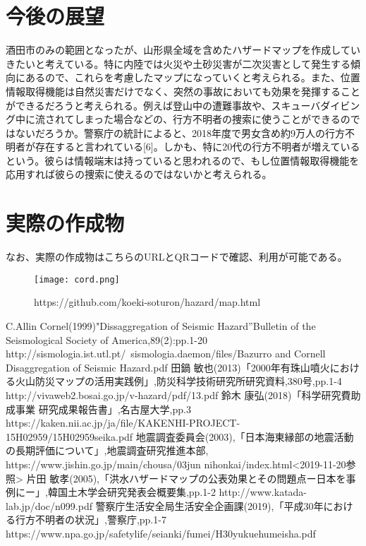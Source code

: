 \documentclass[a4j,twocolumn,dvipdfmx]{jarticle}
\begin{document}
     \section{今後の展望}
酒田市のみの範囲となったが、山形県全域を含めたハザードマップを作成していきたいと考えている。特に内陸では火災や土砂災害が二次災害として発生する傾向にあるので、これらを考慮したマップになっていくと考えられる。また、位置情報取得機能は自然災害だけでなく、突然の事故においても効果を発揮することができるだろうと考えられる。例えば登山中の遭難事故や、スキューバダイビング中に流されてしまった場合などの、行方不明者の捜索に使うことができるのではないだろうか。警察庁の統計によると、2018年度で男女含め約9万人の行方不明者が存在すると言われている[6]。しかも、特に20代の行方不明者が増えているという。彼らは情報端末は持っていると思われるので、もし位置情報取得機能を応用すれば彼らの捜索に使えるのではないかと考えられる。
     \section{\large 実際の作成物}
なお、実際の作成物はこちらのURLとQRコードで確認、利用が可能である。
   \begin{center}
   \begin{figure}[htp]
     \texttt{[image: cord.png]}
     \caption{https:\slash\slash{}github.com\slash{}koeki-soturon\slash{}hazard\slash{}map.html}
   \end{figure}
   \end{center}
   \begin{thebibliography}{9}
   \bibitem[1]C.Allin Cornel(1999)"Dissaggregation of Seismic Hazard''Bulletin of the Seismological Society of America,89(2):pp.1-20
     http:\slash\slash{}sismologia.ist.utl.pt\slash{}~sismologia.daemon\slash{}files\slash{}Bazurro and Cornell Disaggregation of Seismic Hazard.pdf
   \bibitem[2]田鍋 敏也(2013)「2000年有珠山噴火における火山防災マップの活用実践例」,防災科学技術研究所研究資料,380号,pp.1-4
     http:\slash\slash{}vivaweb2.bosai.go.jp\slash{}v-hazard\slash{}pdf\slash{}13.pdf
   \bibitem[3]鈴木 康弘(2018)「科学研究費助成事業 研究成果報告書」,名古屋大学,pp.3
     https:\slash\slash{}kaken.nii.ac.jp\slash{}ja\slash{}file\slash{}KAKENHI-PROJECT-15H02959\slash{}15H02959seika.pdf
      \bibitem[4]地震調査委員会(2003),「日本海東縁部の地震活動の長期評価について」,地震調査研究推進本部,
        https://www.jishin.go.jp/main/chousa/03jun nihonkai/index.html<2019-11-20参照>
      \bibitem[5]片田 敏孝(2005),「洪水ハザードマップの公表効果とその問題点ー日本を事例にー」,韓国土木学会研究発表会概要集,pp.1-2
        http://www.katada-lab.jp/doc/n099.pdf
 \bibitem[6]警察庁生活安全局生活安全企画課(2019),「平成30年における行方不明者の状況」,警察庁,pp.1-7
   https://www.npa.go.jp/safetylife/seianki/fumei/H30yukuehumeisha.pdf
     \end{thebibliography}
\end{document}
